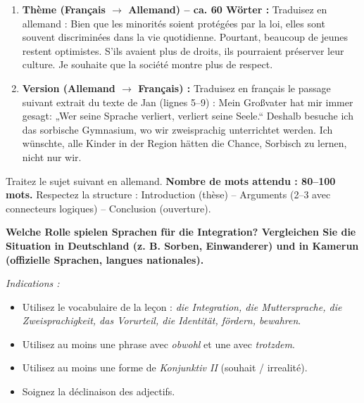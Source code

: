 \documentclass[11pt]{article}
\begin{document}
\begin{exercice}
\begin{enumerate}
    \item \textbf{Thème (Français $\rightarrow$ Allemand) -- ca. 60 Wörter :}
    Traduisez en allemand :
    \guillemotleft Bien que les minorités soient protégées par la loi, elles sont souvent discriminées dans la vie quotidienne. Pourtant, beaucoup de jeunes restent optimistes. S'ils avaient plus de droits, ils pourraient préserver leur culture. Je souhaite que la société montre plus de respect. \guillemotright
    \item \textbf{Version (Allemand $\rightarrow$ Français) :}
    Traduisez en français le passage suivant extrait du texte de Jan (lignes 5--9) :
    \guillemotleft Mein Großvater hat mir immer gesagt: „Wer seine Sprache verliert, verliert seine Seele.“ Deshalb besuche ich das sorbische Gymnasium, wo wir zweisprachig unterrichtet werden. Ich wünschte, alle Kinder in der Region hätten die Chance, Sorbisch zu lernen, nicht nur wir. \guillemotright
\end{enumerate}
\end{exercice}

\begin{exercice}
Traitez le sujet suivant en allemand. \textbf{Nombre de mots attendu : 80--100 mots.}
Respectez la structure : Introduction (thèse) -- Arguments (2--3 avec connecteurs logiques) -- Conclusion (ouverture).

\begin{textebox}[Sujet]
\textbf{Welche Rolle spielen Sprachen für die Integration? Vergleichen Sie die Situation in Deutschland (z. B. Sorben, Einwanderer) und in Kamerun (offizielle Sprachen, langues nationales).}

\textit{Indications :}
\begin{itemize}
    \item Utilisez le vocabulaire de la leçon : \emph{die Integration, die Muttersprache, die Zweisprachigkeit, das Vorurteil, die Identität, fördern, bewahren}.
    \item Utilisez au moins une phrase avec \emph{obwohl} et une avec \emph{trotzdem}.
    \item Utilisez au moins une forme de \emph{Konjunktiv II} (souhait / irrealité).
    \item Soignez la déclinaison des adjectifs.
\end{itemize}
\end{textebox}
\end{exercice}
\end{document}
